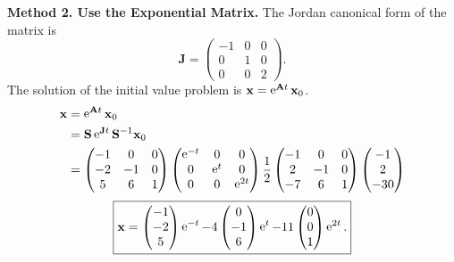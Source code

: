 {\begin{Solution}
  \textbf{Method 2.  Use the Exponential Matrix.}
  The Jordan canonical form of the matrix is
  \[
  \mathbf{J} =
  \begin{pmatrix}
    -1 & 0 & 0 \\
    0 & 1 & 0 \\
    0 & 0 & 2
  \end{pmatrix}.
  \]
  The solution of the initial value problem is $\mathbf{x} = \mathop{\mathrm{e}}\nolimits^{\mathbf{A} t} \mathbf{x}_0$.
  \begin{align*}
    \mathbf{x} &= \mathop{\mathrm{e}}\nolimits^{\mathbf{A} t} \mathbf{x}_0 \\
    &= \mathbf{S} \mathop{\mathrm{e}}\nolimits^{\mathbf{J} t} \mathbf{S}^{-1} \mathbf{x}_0 \\
    &= \begin{pmatrix} -1 & 0 & 0 \\ 
      -2 & -1 & 0 \\ 
      5 & 6 & 1 \end{pmatrix}
    \begin{pmatrix} \mathop{\mathrm{e}}\nolimits^{-t} & 0 & 0 \\ 
      0 & \mathop{\mathrm{e}}\nolimits^{t} & 0 \\ 
      0 & 0 & \mathop{\mathrm{e}}\nolimits^{2 t} \end{pmatrix}
    \frac{1}{2} \begin{pmatrix} -1 & 0 & 0 \\
      2 & -1 & 0 \\
      -7 & 6 & 1 \end{pmatrix}
    \begin{pmatrix} -1 \\ 2 \\ -30 \end{pmatrix}
  \end{align*}
  \[
  \boxed{
    \mathbf{x} = 
    \begin{pmatrix} -1 \\ -2 \\ 5 \end{pmatrix} \mathop{\mathrm{e}}\nolimits^{-t}
    -4 \begin{pmatrix} 0 \\ -1 \\ 6 \end{pmatrix} \mathop{\mathrm{e}}\nolimits^t
    -11 \begin{pmatrix} 0 \\ 0 \\ 1 \end{pmatrix} \mathop{\mathrm{e}}\nolimits^{2 t}.
    }
  \]
\end{Solution}










}
